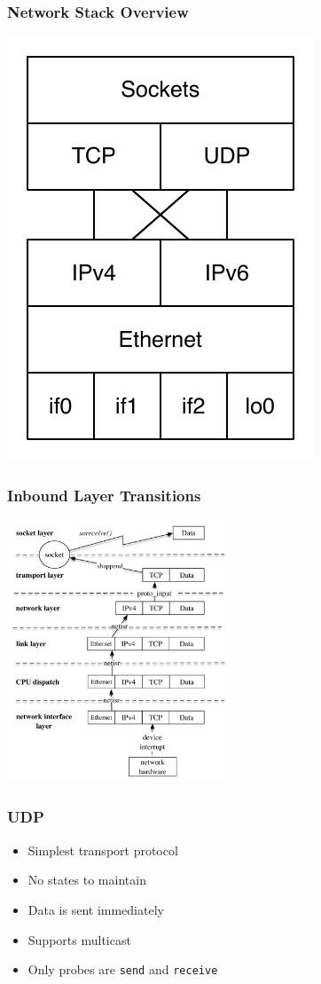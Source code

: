 \documentclass[pdftex]{beamer} %
\begin{document}
\begin{frame}
  \frametitle{Network Stack Overview}
\centering
\includegraphics{../figures/tcpipstack}
\end{frame}

\begin{frame}
\centering
  \frametitle{Inbound Layer Transitions}
\includegraphics[width=0.5\textwidth]{../figures/inbound}
\end{frame}

\begin{frame}[fragile]
  \frametitle{UDP}
  \begin{itemize}
  \item Simplest transport protocol
  \item No states to maintain
  \item Data is sent immediately
  \item Supports multicast
  \item Only probes are \verb+send+ and \verb+receive+
  \end{itemize}
\end{frame}
\end{document}
